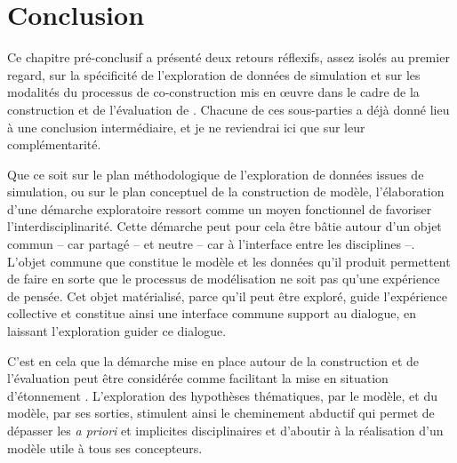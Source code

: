 %
%

\section*{Conclusion}

Ce chapitre \og pré-conclusif\fg{} a présenté deux retours réflexifs, assez isolés au premier regard, sur la spécificité de l'exploration de données de simulation et sur les modalités du processus de co-construction mis en œuvre dans le cadre de la construction et de l'évaluation de \simfeodal{}.
Chacune de ces sous-parties a déjà donné lieu à une conclusion intermédiaire, et je ne reviendrai ici que sur leur complémentarité.

Que ce soit sur le plan méthodologique de l'exploration de données issues de simulation, ou sur le plan conceptuel de la construction de modèle, l'élaboration d'une démarche exploratoire ressort comme un moyen fonctionnel de favoriser l'interdisciplinarité.
Cette démarche peut pour cela être bâtie autour d'un objet commun -- car partagé -- et neutre -- car à l'interface entre les disciplines --. 
L'objet commune que constitue le modèle et les données qu'il produit permettent de faire en sorte que le processus de modélisation ne soit pas qu'une expérience de pensée.
Cet objet matérialisé, parce qu'il peut être exploré, guide l'expérience collective et constitue ainsi une interface commune support au dialogue, en laissant l'exploration guider ce dialogue.

C'est en cela que la démarche mise en place autour de la construction et de l'évaluation peut être considérée comme facilitant la \og mise en situation d'étonnement\fg{} \autocite[241]{banos2005voie}.
L'exploration des hypothèses thématiques, par le modèle, et du modèle, par ses sorties, stimulent ainsi le cheminement abductif qui permet de dépasser les \textit{a priori} et implicites disciplinaires et d'aboutir à la réalisation d'un modèle utile à tous ses concepteurs.

